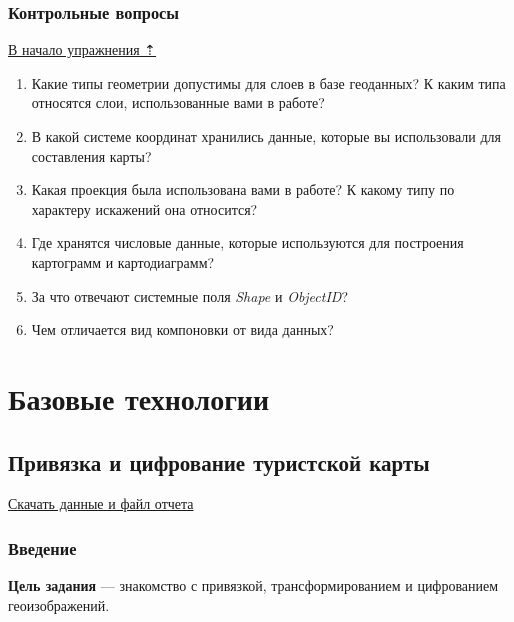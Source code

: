 \documentclass[12pt,]{book}
\begin{document}
\hypertarget{map-design-economic-questions}{%
\section{Контрольные вопросы}\label{map-design-economic-questions}}

\protect\hyperlink{map-design-economic}{В начало упражнения ⇡}

\begin{enumerate}
\def\labelenumi{\arabic{enumi}.}
\item
  Какие типы геометрии допустимы для слоев в базе геоданных? К каким типа относятся слои, использованные вами в работе?
\item
  В какой системе координат хранились данные, которые вы использовали для составления карты?
\item
  Какая проекция была использована вами в работе? К какому типу по характеру искажений она относится?
\item
  Где хранятся числовые данные, которые используются для построения картограмм и картодиаграмм?
\item
  За что отвечают системные поля \emph{Shape} и \emph{ObjectID}?
\item
  Чем отличается вид компоновки от вида данных?
\end{enumerate}

\hypertarget{part--}{%
\part{Базовые технологии}\label{part--}}

\hypertarget{map-ref-general}{%
\chapter{Привязка и цифрование туристской карты}\label{map-ref-general}}

\href{http://autolab.geogr.msu.ru/gis/data/Ex05.zip}{Скачать данные и файл отчета}

\hypertarget{map-ref-general-intro}{%
\section{Введение}\label{map-ref-general-intro}}

\textbf{Цель задания} --- знакомство с привязкой, трансформированием и цифрованием геоизображений.
\end{document}
